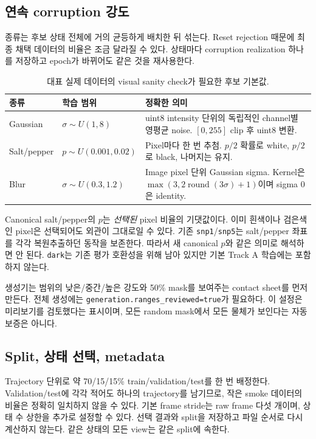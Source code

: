 \documentclass[11pt,a4paper]{article}
\newcommand{\code}[1]{\nolinkurl{#1}}
\begin{document}
\subsection{연속 corruption 강도}
종류는 후보 상태 전체에 거의 균등하게 배치한 뒤 섞는다. Reset rejection 때문에
최종 채택 데이터의 비율은 조금 달라질 수 있다. 상태마다 corruption realization
하나를 저장하고 epoch가 바뀌어도 같은 것을 재사용한다.
\begin{table}[htbp]\centering\small
\begin{tabularx}{\linewidth}{l l X}
\toprule 종류 & 학습 범위 & 정확한 의미 \\\midrule
Gaussian & $\sigma\sim U(1,8)$ & uint8 intensity 단위의 독립적인 channel별 영평균 noise. $[0,255]$ clip 후 uint8 변환. \\
Salt/pepper & $p\sim U(0.001,0.02)$ & Pixel마다 한 번 추첨. $p/2$ 확률로 white, $p/2$로 black, 나머지는 유지. \\
Blur & $\sigma\sim U(0.3,1.2)$ & Image pixel 단위 Gaussian sigma. Kernel은 $\max(3,2\operatorname{round}(3\sigma)+1)$이며 sigma 0은 identity. \\\bottomrule
\end{tabularx}
\caption{대표 실제 데이터의 visual sanity check가 필요한 후보 기본값.}
\end{table}
Canonical salt/pepper의 $p$는 \emph{선택된} pixel 비율의 기댓값이다. 이미
흰색이나 검은색인 pixel은 선택되어도 외관이 그대로일 수 있다.
기존 \code{snp1}/\code{snp5}는 salt/pepper 좌표를 각각 복원추출하던 동작을
보존한다. 따라서 새 canonical $p$와 같은 의미로 해석하면 안 된다.
\code{dark}는 기존 평가 호환성을 위해 남아 있지만 기본 Track A 학습에는 포함하지 않는다.

생성기는 범위의 낮은/중간/높은 강도와 50\% mask를 보여주는 contact sheet를
먼저 만든다. 전체 생성에는 \code{generation.ranges_reviewed=true}가 필요하다.
이 설정은 미리보기를 검토했다는 표시이며, 모든 random mask에서 모든 물체가
보인다는 자동 보증은 아니다.

\subsection{Split, 상태 선택, metadata}
Trajectory 단위로 약 70/15/15\% train/validation/test를 한 번 배정한다.
Validation/test에 각각 적어도 하나의 trajectory를 남기므로, 작은 smoke
데이터의 비율은 정확히 일치하지 않을 수 있다. 기본 frame stride는 raw frame
다섯 개이며, 상태 수 상한을 추가로 설정할 수 있다. 선택 결과와 split을 저장하고
파일 순서로 다시 계산하지 않는다. 같은 상태의 모든 view는 같은 split에 속한다.
\end{document}
